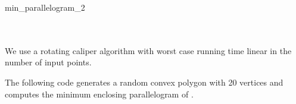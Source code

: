 \begin{ccRefFunction}{min_parallelogram_2}
  \ccSeeAlso
  \\
  \\
  \\
  
  \ccImplementation We use a rotating caliper
   algorithm
  \cite{stvwe-mepa-95,v-fmep-90} with worst case running time linear
  in the number of input points.
  
  \ccExample The following code generates a random convex polygon
   with 20 vertices and computes the minimum enclosing
  parallelogram of .


\end{ccRefFunction}

